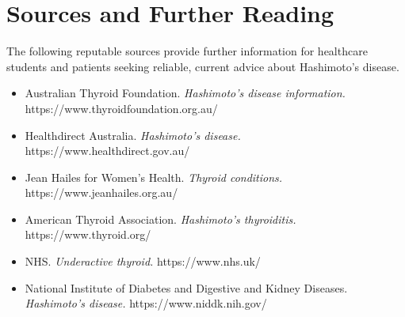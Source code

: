 \section*{Sources and Further Reading}
The following reputable sources provide further information for healthcare students and patients seeking reliable, current advice about Hashimoto's disease.

\begin{itemize}
    \item Australian Thyroid Foundation. \textit{Hashimoto's disease information.} https://www.thyroidfoundation.org.au/
    \item Healthdirect Australia. \textit{Hashimoto's disease.} https://www.healthdirect.gov.au/
    \item Jean Hailes for Women's Health. \textit{Thyroid conditions.} https://www.jeanhailes.org.au/
    \item American Thyroid Association. \textit{Hashimoto's thyroiditis.} https://www.thyroid.org/
    \item NHS. \textit{Underactive thyroid.} https://www.nhs.uk/
    \item National Institute of Diabetes and Digestive and Kidney Diseases. \textit{Hashimoto's disease.} https://www.niddk.nih.gov/
\end{itemize}
